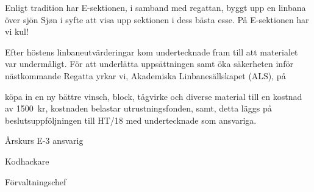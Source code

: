 \documentclass[../_main/handlingar.tex]{subfiles}
\begin{document}

Enligt tradition har E-sektionen, i samband med regattan, byggt upp en linbana över sjön Sjøn i syfte att visa upp sektionen i dess bästa esse.
På E-sektionen har vi kul!

Efter höstens linbaneutvärderingar kom undertecknade fram till att materialet var undermåligt.
För att underlätta uppsättningen samt öka säkerheten inför nästkommande Regatta yrkar vi, Akademiska Linbanesällskapet (ALS), på

\begin{attsatser}
	\att köpa in en ny bättre vinsch, block, tågvirke och diverse material till en kostnad av \SI{1500}{kr},
	\att kostnaden belastar utrustningsfonden, samt,
	\att detta läggs på beslutsuppföljningen till HT/18 med undertecknade som ansvariga.
\end{attsatser}

\begin{signatures}{3}
	\mvh
	\signature{Jonatan Kronander}{Årskurs E-3 ansvarig}
	\signature{Filip Kronström}{Kodhackare}
	\signature{Magnus Lundh}{Förvaltningschef}
\end{signatures}
\end{document}
